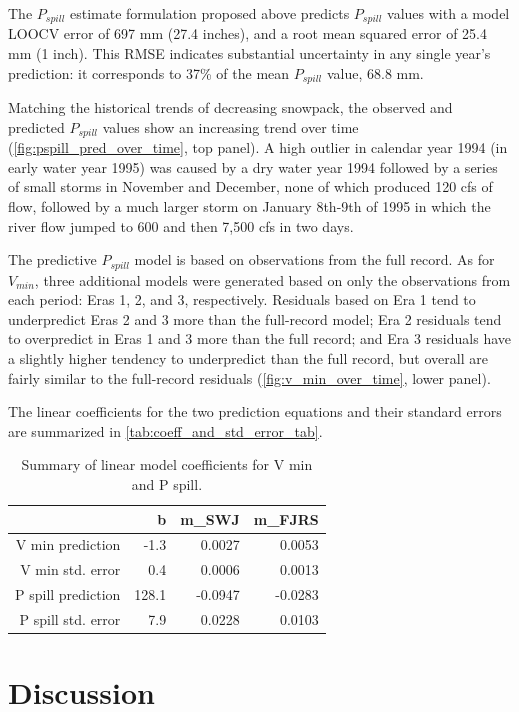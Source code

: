 \documentclass[hess, manuscript]{copernicus}
\begin{document}
The \(P_{spill}\) estimate formulation proposed above predicts
\(P_{spill}\) values with a model LOOCV error of 697 mm (27.4 inches),
and a root mean squared error of 25.4 mm (1 inch). This RMSE indicates
substantial uncertainty in any single year's prediction: it corresponds
to 37\% of the mean \(P_{spill}\) value, 68.8 mm.

Matching the historical trends of decreasing snowpack, the observed and
predicted \(P_{spill}\) values show an increasing trend over time
(\autoref{fig:pspill_pred_over_time}, top panel). A high outlier in
calendar year 1994 (in early water year 1995) was caused by a dry water
year 1994 followed by a series of small storms in November and December,
none of which produced 120 cfs of flow, followed by a much larger storm
on January 8th-9th of 1995 in which the river flow jumped to 600 and
then 7,500 cfs in two days.

The predictive \(P_{spill}\) model is based on observations from the
full record. As for \(V_{min}\), three additional models were generated
based on only the observations from each period: Eras 1, 2, and 3,
respectively. Residuals based on Era 1 tend to underpredict Eras 2 and 3
more than the full-record model; Era 2 residuals tend to overpredict in
Eras 1 and 3 more than the full record; and Era 3 residuals have a
slightly higher tendency to underpredict than the full record, but
overall are fairly similar to the full-record residuals
(\autoref{fig:v_min_over_time}, lower panel).

The linear coefficients for the two prediction equations and their
standard errors are summarized in \autoref{tab:coeff_and_std_error_tab}.

\begin{table}[ht]
\centering
\caption{Summary of linear model coefficients for V min and P spill.} 
\label{tab:coeff_and_std_error_tab}
\begin{tabular}{rrrr}
  \hline
 & b & m\_SWJ & m\_FJRS \\ 
  \hline
V min prediction & -1.3 & 0.0027 & 0.0053 \\ 
  V min std. error & 0.4 & 0.0006 & 0.0013 \\ 
  P spill prediction & 128.1 & -0.0947 & -0.0283 \\ 
  P spill std. error & 7.9 & 0.0228 & 0.0103 \\ 
   \hline
\end{tabular}
\end{table}

\section{Discussion}
\end{document}
